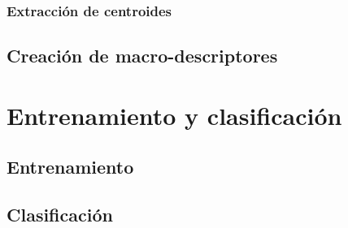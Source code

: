 		\subsubsection{Extracción de centroides}
		\label{algoritmo:ext_centroides}
		
	\subsection{Creación de macro-descriptores}
	\label{algoritmo:crea_macro-descriptores}
	
\section{Entrenamiento y clasificación}
\label{sec:clasificacion}

	\subsection{Entrenamiento}
	\label{algoritmo:entrenamiento}
	
	\subsection{Clasificación}
	\label{algoritmo:clasificacion}
	
	
	
	
	
	
	
